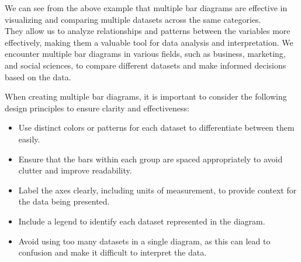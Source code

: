 \documentclass[openany]{book}
\begin{document}
We can see from the above example that multiple bar diagrams are effective in visualizing and comparing multiple datasets across the same categories. \\
They allow us to analyze relationships and patterns between the variables more effectively, making them a valuable tool for data analysis and interpretation. We encounter multiple bar diagrams in various fields, such as business, marketing, and social sciences, to compare different datasets and make informed decisions based on the data.
\begin{mynote}
    When creating multiple bar diagrams, it is important to consider the following design principles to ensure clarity and effectiveness:
    \begin{itemize}
        \item Use distinct colors or patterns for each dataset to differentiate between them easily.
        \item Ensure that the bars within each group are spaced appropriately to avoid clutter and improve readability.
        \item Label the axes clearly, including units of measurement, to provide context for the data being presented.
        \item Include a legend to identify each dataset represented in the diagram.
        \item Avoid using too many datasets in a single diagram, as this can lead to confusion and make it difficult to interpret the data.
    \end{itemize}
\end{mynote}
\end{document}
